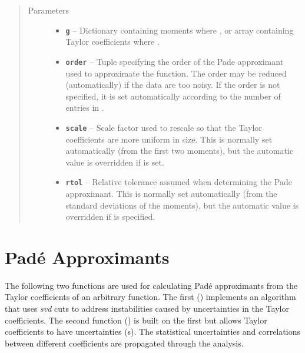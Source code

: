 \documentclass[letterpaper,10pt,english]{sphinxmanual}
\begin{document}
\begin{fulllineitems}
\begin{itemize}
\begin{description}
\end{description}

\end{itemize}
\begin{quote}\begin{description}
\item[{Parameters}] \leavevmode\begin{itemize}
\item {} 
\textbf{\texttt{g}} -- Dictionary containing moments where ,
or array containing Taylor coefficients where
.

\item {} 
\textbf{\texttt{order}} -- Tuple  specifying the order of the Pade
approximant used to approximate the function. The order may
be reduced (automatically) if the data are too noisy.
If the order is not specified, it is set automatically
according to the number of entries in .

\item {} 
\textbf{\texttt{scale}} -- Scale factor used to rescale  so that
the Taylor coefficients are more uniform in size. This is
normally set automatically (from the first two moments),
but the automatic value is overridden if  is set.

\item {} 
\textbf{\texttt{rtol}} -- Relative tolerance assumed when determining the
Pade approximant. This is normally set automatically
(from the standard deviations of the moments), but the
automatic value is overridden if  is specified.

\end{itemize}

\end{description}\end{quote}

\end{fulllineitems}



\section{Padé Approximants}
\label{g2tools:pade-approximants}
The following two functions are used for calculating Padé approximants from
the Taylor coefficients of an arbitrary function. The first
({\hyperref[g2tools:g2tools.pade_svd]{\emph{}}}) implements an algorithm that uses \emph{svd} cuts to
address instabilities caused  by uncertainties in the Taylor coefficients. The
second function ({\hyperref[g2tools:g2tools.pade_gvar]{\emph{}}}) is built on the first but allows
Taylor coefficients to have uncertainties (s). The statistical
uncertainties and correlations between different coefficients are propagated
through the analysis.
\end{document}
